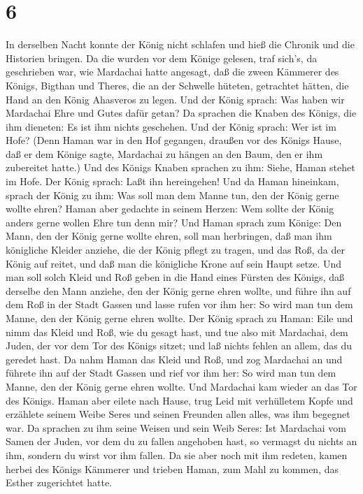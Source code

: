 \hypertarget{section-5}{%
\section{6}\label{section-5}}

 In derselben Nacht konnte der König nicht schlafen und hieß
die Chronik und die Historien bringen. Da die wurden vor dem Könige
gelesen,  traf sich's, da geschrieben war, wie Mardachai
hatte angesagt, daß die zween Kämmerer des Königs, Bigthan und Theres,
die an der Schwelle hüteten, getrachtet hätten, die Hand an den König
Ahasveros zu legen.  Und der König sprach: Was haben wir
Mardachai Ehre und Gutes dafür getan? Da sprachen die Knaben des Königs,
die ihm dieneten: Es ist ihm nichts geschehen.  Und der
König sprach: Wer ist im Hofe? (Denn Haman war in den Hof gegangen,
draußen vor des Königs Hause, daß er dem Könige sagte, Mardachai zu
hängen an den Baum, den er ihm zubereitet hatte.)  Und des
Königs Knaben sprachen zu ihm: Siehe, Haman stehet im Hofe. Der König
sprach: Laßt ihn hereingehen!  Und da Haman hineinkam,
sprach der König zu ihm: Was soll man dem Manne tun, den der König gerne
wollte ehren? Haman aber gedachte in seinem Herzen: Wem sollte der König
anders gerne wollen Ehre tun denn mir?  Und Haman sprach zum
Könige: Den Mann, den der König gerne wollte ehren,  soll
man herbringen, daß man ihm königliche Kleider anziehe, die der König
pflegt zu tragen, und das Roß, da der König auf reitet, und daß man die
königliche Krone auf sein Haupt setze.  Und man soll solch
Kleid und Roß geben in die Hand eines Fürsten des Königs, daß derselbe
den Mann anziehe, den der König gerne ehren wollte, und führe ihn auf
dem Roß in der Stadt Gassen und lasse rufen vor ihm her: So wird man tun
dem Manne, den der König gerne ehren wollte.  Der König
sprach zu Haman: Eile und nimm das Kleid und Roß, wie du gesagt hast,
und tue also mit Mardachai, dem Juden, der vor dem Tor des Königs
sitzet; und laß nichts fehlen an allem, das du geredet hast.
 Da nahm Haman das Kleid und Roß, und zog Mardachai an und
führete ihn auf der Stadt Gassen und rief vor ihm her: So wird man tun
dem Manne, den der König gerne ehren wollte.  Und Mardachai
kam wieder an das Tor des Königs. Haman aber eilete nach Hause, trug
Leid mit verhülletem Kopfe  und erzählete seinem Weibe
Seres und seinen Freunden allen alles, was ihm begegnet war. Da sprachen
zu ihm seine Weisen und sein Weib Seres: Ist Mardachai vom Samen der
Juden, vor dem du zu fallen angehoben hast, so vermagst du nichts an
ihm, sondern du wirst vor ihm fallen.  Da sie aber noch mit
ihm redeten, kamen herbei des Königs Kämmerer und trieben Haman, zum
Mahl zu kommen, das Esther zugerichtet hatte.

